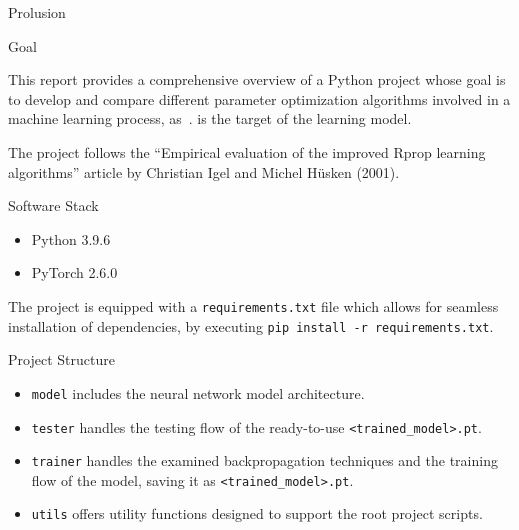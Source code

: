 
\clearpage
\begin{chapter}{Prolusion}
    \begin{section}{Goal}
        \par This report provides a comprehensive overview of a Python project whose goal is to develop and compare different parameter optimization algorithms involved in a machine learning process, as~.  is the target of the learning model.
		\par The project follows the ``Empirical evaluation of the improved Rprop learning algorithms'' article by Christian Igel and Michel Hüsken (2001).
    \end{section}
    \newpage
	\begin{section}{Software Stack}
		\begin{itemize}
			\item Python 3.9.6
			\item PyTorch 2.6.0
		\end{itemize}
		The project is equipped with a \texttt{requirements.txt} file which allows for seamless installation of dependencies, by executing \texttt{pip install -r requirements.txt}.
	\end{section}
	\newpage
	\begin{section}{Project Structure}
		\medskip
		\begin{itemize}
			\item \texttt{model} includes the neural network model architecture.
			\item \texttt{tester} handles the testing flow of the ready-to-use \texttt{<trained\_model>.pt}.
			\item \texttt{trainer} handles the examined backpropagation techniques and the training flow of the model, saving it as \texttt{<trained\_model>.pt}.
			\item \texttt{utils} offers utility functions designed to support the root project scripts.
		\end{itemize}
	\end{section}
\end{chapter}